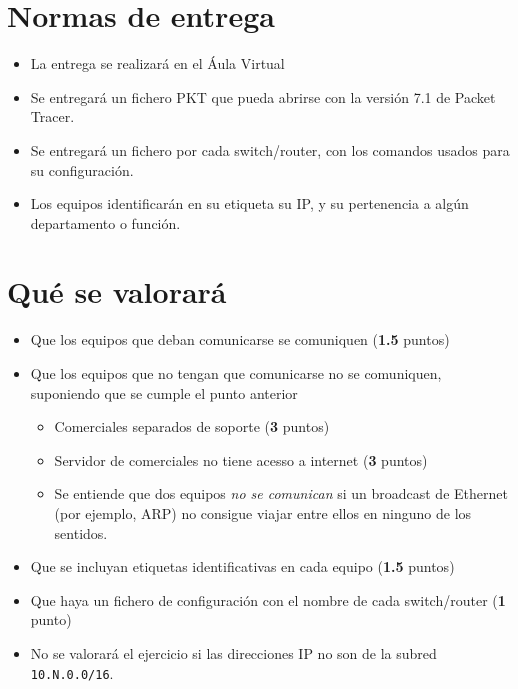 \section{Normas de entrega}
\begin{itemize}
  
\item La entrega se realizará en el Áula Virtual
\item Se entregará un fichero PKT que pueda abrirse con la versión 7.1 de Packet Tracer.
\item Se entregará un fichero por cada switch/router, con los comandos usados para su configuración.
\item Los equipos identificarán en su etiqueta su IP, y su pertenencia a algún departamento o función.
\end{itemize}

\section{Qué se valorará}
\begin{itemize}
\item Que los equipos que deban comunicarse se comuniquen (\textbf{1.5} puntos)
\item Que los equipos que no tengan que comunicarse no se comuniquen, suponiendo que se cumple el punto anterior
  \begin{itemize}
  \item Comerciales separados de soporte (\textbf{3} puntos)
  \item Servidor de comerciales no tiene acesso a internet (\textbf{3} puntos)
  \item Se entiende que dos equipos \textit{no se comunican} si un broadcast de Ethernet (por ejemplo, ARP) no consigue viajar entre ellos en ninguno de los sentidos.
  \end{itemize}
\item Que se incluyan etiquetas identificativas en cada equipo (\textbf{1.5} puntos)  
\item Que haya un fichero de configuración con el nombre de cada switch/router (\textbf{1} punto)
\item No se valorará el ejercicio si las direcciones IP no son de la subred \texttt{10.N.0.0/16}.
\end{itemize}




